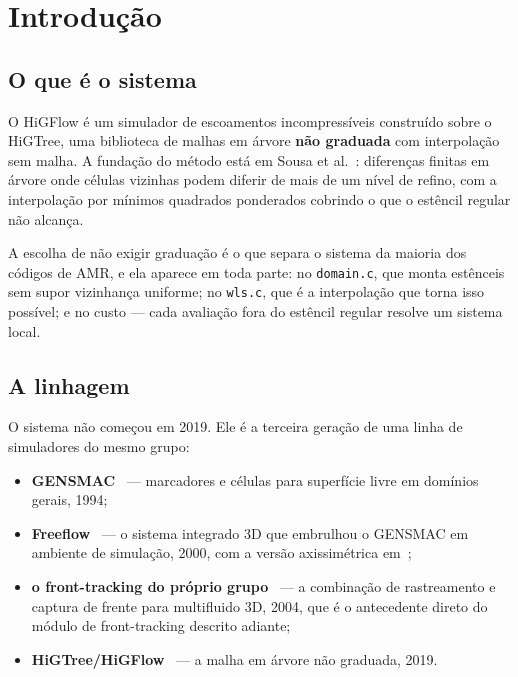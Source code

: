 \section{Introdu\c{c}\~ao}

\subsection{O que \'e o sistema}

O HiGFlow \'e um simulador de escoamentos incompress\'iveis constru\'ido sobre o
HiGTree, uma biblioteca de malhas em \'arvore \textbf{n\~ao graduada} com
interpola\c{c}\~ao sem malha. A funda\c{c}\~ao do m\'etodo est\'a em Sousa et
al.~\cite{sousa2019}: diferen\c{c}as finitas em \'arvore onde c\'elulas vizinhas
podem diferir de mais de um n\'ivel de refino, com a interpola\c{c}\~ao por
m\'inimos quadrados ponderados cobrindo o que o estêncil regular n\~ao alcan\c{c}a.

A escolha de n\~ao exigir gradua\c{c}\~ao \'e o que separa o sistema da maioria
dos c\'odigos de AMR, e ela aparece em toda parte: no
\texttt{domain.c}, que monta estênceis sem supor vizinhan\c{c}a uniforme; no
\texttt{wls.c}, que \'e a interpola\c{c}\~ao que torna isso poss\'ivel; e no custo
--- cada avalia\c{c}\~ao fora do estêncil regular resolve um sistema local.

\subsection{A linhagem}

O sistema n\~ao come\c{c}ou em 2019. Ele \'e a terceira gera\c{c}\~ao de uma
linha de simuladores do mesmo grupo:

\begin{itemize}
  \item \textbf{GENSMAC}~\cite{tome1994} --- marcadores e c\'elulas para
    superf\'icie livre em dom\'inios gerais, 1994;
  \item \textbf{Freeflow}~\cite{castelo2000} --- o sistema integrado 3D que
    embrulhou o GENSMAC em ambiente de simula\c{c}\~ao, 2000, com a vers\~ao
    axissim\'etrica em~\cite{tome2000};
  \item \textbf{o front-tracking do pr\'oprio grupo}~\cite{sousa2004} --- a
    combina\c{c}\~ao de rastreamento e captura de frente para multifluido 3D,
    2004, que \'e o antecedente direto do m\'odulo de front-tracking descrito
    adiante;
  \item \textbf{HiGTree/HiGFlow}~\cite{sousa2019} --- a malha em \'arvore n\~ao
    graduada, 2019.
\end{itemize}

